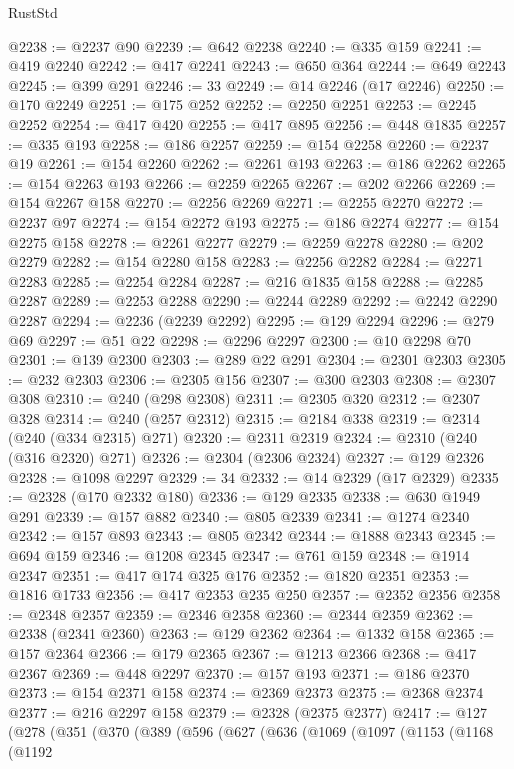 \begin{lexlean}{RustStd}
\begin{coremodule}
{\begin{coremodule}
{{{{{{{{{{{{{{{{{{{{{{{{{{{{{{{{{{{{{{{@2238 := @2237 @90
@2239 := @642 @2238
@2240 := @335 @159
@2241 := @419 @2240
@2242 := @417 @2241
@2243 := @650 @364
@2244 := @649 @2243
@2245 := @399 @291
@2246 := 33
@2249 := @14 @2246 (@17 @2246)
@2250 := @170 @2249
@2251 := @175 @252
@2252 := @2250 @2251
@2253 := @2245 @2252
@2254 := @417 @420
@2255 := @417 @895
@2256 := @448 @1835
@2257 := @335 @193
@2258 := @186 @2257
@2259 := @154 @2258
@2260 := @2237 @19
@2261 := @154 @2260
@2262 := @2261 @193
@2263 := @186 @2262
@2265 := @154 @2263 @193
@2266 := @2259 @2265
@2267 := @202 @2266
@2269 := @154 @2267 @158
@2270 := @2256 @2269
@2271 := @2255 @2270
@2272 := @2237 @97
@2274 := @154 @2272 @193
@2275 := @186 @2274
@2277 := @154 @2275 @158
@2278 := @2261 @2277
@2279 := @2259 @2278
@2280 := @202 @2279
@2282 := @154 @2280 @158
@2283 := @2256 @2282
@2284 := @2271 @2283
@2285 := @2254 @2284
@2287 := @216 @1835 @158
@2288 := @2285 @2287
@2289 := @2253 @2288
@2290 := @2244 @2289
@2292 := @2242 @2290 @2287
@2294 := @2236 (@2239 @2292)
@2295 := @129 @2294
@2296 := @279 @69
@2297 := @51 @22
@2298 := @2296 @2297
@2300 := @10 @2298 @70
@2301 := @139 @2300
@2303 := @289 @22 @291
@2304 := @2301 @2303
@2305 := @232 @2303
@2306 := @2305 @156
@2307 := @300 @2303
@2308 := @2307 @308
@2310 := @240 (@298 @2308)
@2311 := @2305 @320
@2312 := @2307 @328
@2314 := @240 (@257 @2312)
@2315 := @2184 @338
@2319 := @2314 (@240 (@334 @2315) @271)
@2320 := @2311 @2319
@2324 := @2310 (@240 (@316 @2320) @271)
@2326 := @2304 (@2306 @2324)
@2327 := @129 @2326
@2328 := @1098 @2297
@2329 := 34
@2332 := @14 @2329 (@17 @2329)
@2335 := @2328 (@170 @2332 @180)
@2336 := @129 @2335
@2338 := @630 @1949 @291
@2339 := @157 @882
@2340 := @805 @2339
@2341 := @1274 @2340
@2342 := @157 @893
@2343 := @805 @2342
@2344 := @1888 @2343
@2345 := @694 @159
@2346 := @1208 @2345
@2347 := @761 @159
@2348 := @1914 @2347
@2351 := @417 @174 @325 @176
@2352 := @1820 @2351
@2353 := @1816 @1733
@2356 := @417 @2353 @235 @250
@2357 := @2352 @2356
@2358 := @2348 @2357
@2359 := @2346 @2358
@2360 := @2344 @2359
@2362 := @2338 (@2341 @2360)
@2363 := @129 @2362
@2364 := @1332 @158
@2365 := @157 @2364
@2366 := @179 @2365
@2367 := @1213 @2366
@2368 := @417 @2367
@2369 := @448 @2297
@2370 := @157 @193
@2371 := @186 @2370
@2373 := @154 @2371 @158
@2374 := @2369 @2373
@2375 := @2368 @2374
@2377 := @216 @2297 @158
@2379 := @2328 (@2375 @2377)
@2417 := @127
    (@278
      (@351
        (@370
          (@389
            (@596
              (@627
                (@636
                  (@1069
                    (@1097
                      (@1153
                        (@1168
                          (@1192
}}}}}}}}}}}}}}}}}}}}}}}}}}}}}}}}}}}}}}}
\end{coremodule}}
\end{coremodule}
\end{lexlean}

